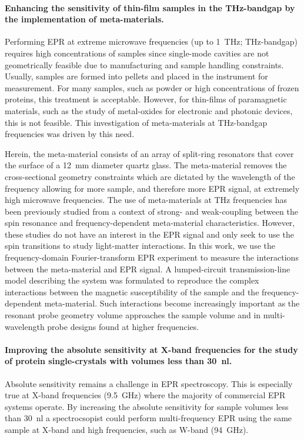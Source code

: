 \hspace{1em}
\noindent\paragraph*{Enhancing the sensitivity of thin-film samples in the THz-bandgap by the implementation of meta-materials.}
Performing EPR at extreme microwave frequencies (up to 1~THz; THz-bandgap) requires high concentrations of samples since single-mode cavities are not geometrically feasible due to manufacturing and sample handling constraints. Usually, samples are formed into pellets and placed in the instrument for measurement. \cite{NEHRKORN201710} For many samples, such as powder or high concentrations of frozen proteins, this treatment is acceptable. However, for thin-films of paramagnetic materials, such as the study of metal-oxides for electronic and photonic devices, this is not feasible. \cite{oxidesurface} This investigation of meta-materials at THz-bandgap frequencies was driven by this need.

Herein, the meta-material consists of an array of split-ring resonators that cover the surface of a 12~mm diameter quartz glass. The meta-material removes the cross-sectional geometry constraints which are dictated by the wavelength of the frequency allowing for more sample, and therefore more EPR signal, at extremely high microwave frequencies. The use of meta-materials at THz frequencies has been previously studied from a context of strong- and weak-coupling between the spin resonance and frequency-dependent meta-material characteristics.\cite{SchneiderEPR,BOERO2013133,Scalari1323} However, these studies do not have an interest in the EPR signal and only seek to use the spin transitions to study light-matter interactions. In this work, we use the frequency-domain Fourier-transform EPR experiment to measure the interactions between the meta-material and EPR signal. A lumped-circuit transmission-line model describing the system was formulated to reproduce the complex interactions between the magnetic susceptibility of the sample and the frequency-dependent meta-material. Such interactions become increasingly important as the resonant probe geometry volume approaches the sample volume and in multi-wavelength probe designs found at higher frequencies. \cite{grinbergVHF}

\hspace{1em}
\noindent\paragraph{Improving the absolute sensitivity at X-band frequencies for the study of protein single-crystals with volumes less than 30~nl.}
Absolute sensitivity remains a challenge in EPR spectroscopy. This is especially true at X-band frequencies (9.5~GHz) where the majority of commercial EPR systems operate. By increasing the absolute sensitivity for sample volumes less than 30~nl a spectrocsopist could perform multi-frequency EPR using the same sample at X-band and high frequencies, such as W-band (94~GHz). 

